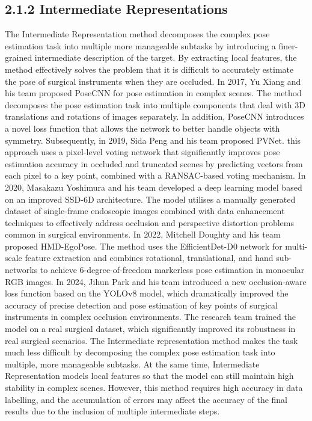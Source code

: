 \documentclass[12pt]{article}
\begin{document}
\subsection{2.1.2 Intermediate Representations}
The Intermediate Representation method decomposes the complex pose estimation task into multiple more manageable subtasks by introducing a finer-grained intermediate description of the target. By extracting local features, the method effectively solves the problem that it is difficult to accurately estimate the pose of surgical instruments when they are occluded\cite{song2020hybridpose}.
In 2017, Yu Xiang and his team proposed PoseCNN for pose estimation in complex scenes. The method decomposes the pose estimation task into multiple components that deal with 3D translations and rotations of images separately. In addition, PoseCNN introduces a novel loss function that allows the network to better handle objects with symmetry\cite{xiang2017posecnn}.
Subsequently, in 2019, Sida Peng and his team proposed PVNet\cite{peng2019pvnet}. this approach uses a pixel-level voting network that significantly improves pose estimation accuracy in occluded and truncated scenes by predicting vectors from each pixel to a key point, combined with a RANSAC-based voting mechanism.
In 2020, Masakazu Yoshimura and his team developed a deep learning model based on an improved SSD-6D architecture\cite{yoshimura2020single}. The model utilises a manually generated dataset of single-frame endoscopic images combined with data enhancement techniques to effectively address occlusion and perspective distortion problems common in surgical environments.
In 2022, Mitchell Doughty and his team proposed HMD-EgoPose\cite{yoshimura2020single}. The method uses the EfficientDet-D0 network for multi-scale feature extraction and combines rotational, translational, and hand sub-networks to achieve 6-degree-of-freedom markerless pose estimation in monocular RGB images.
In 2024, Jihun Park and his team introduced a new occlusion-aware loss function based on the YOLOv8 model, which dramatically improved the accuracy of precise detection and pose estimation of key points of surgical instruments in complex occlusion environments\cite{park2024towards}. The research team trained the model on a real surgical dataset, which significantly improved its robustness in real surgical scenarios.
The Intermediate representation method makes the task much less difficult by decomposing the complex pose estimation task into multiple, more manageable subtasks. At the same time, Intermediate Representation models local features so that the model can still maintain high stability in complex scenes. However, this method requires high accuracy in data labelling, and the accumulation of errors may affect the accuracy of the final results due to the inclusion of multiple intermediate steps\cite{xu2023graph,allan20183}.
\end{document}
